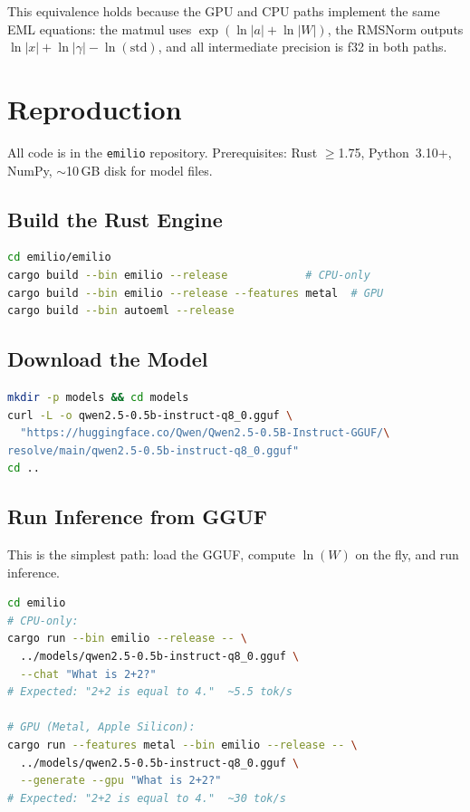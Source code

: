 \documentclass[acmsmall,nonacm]{acmart}
\begin{document}
This equivalence holds because the GPU and CPU paths implement the
same EML equations: the matmul uses $\exp(\ln|a| + \ln|W|)$, the
RMSNorm outputs $\ln|x| + \ln|\gamma| - \ln(\mathrm{std})$, and
all intermediate precision is f32 in both paths.


\section{Reproduction}
\label{sec:reproduce}

All code is in the \texttt{emilio} repository.  Prerequisites: Rust
$\geq$1.75, Python~3.10+, NumPy, $\sim$10\,GB disk for model files.

\subsection{Build the Rust Engine}

\begin{lstlisting}[language=bash,caption={Building emilio.}]
cd emilio/emilio
cargo build --bin emilio --release            # CPU-only
cargo build --bin emilio --release --features metal  # GPU
cargo build --bin autoeml --release
\end{lstlisting}

\subsection{Download the Model}

\begin{lstlisting}[language=bash,caption={Downloading Qwen2.5-0.5B-Instruct Q8.}]
mkdir -p models && cd models
curl -L -o qwen2.5-0.5b-instruct-q8_0.gguf \
  "https://huggingface.co/Qwen/Qwen2.5-0.5B-Instruct-GGUF/\
resolve/main/qwen2.5-0.5b-instruct-q8_0.gguf"
cd ..
\end{lstlisting}

\subsection{Run Inference from GGUF}

This is the simplest path: load the GGUF, compute $\ln(W)$ on the fly,
and run inference.

\begin{lstlisting}[language=bash,caption={GGUF inference (computes ln(W) at load time).}]
cd emilio
# CPU-only:
cargo run --bin emilio --release -- \
  ../models/qwen2.5-0.5b-instruct-q8_0.gguf \
  --chat "What is 2+2?"
# Expected: "2+2 is equal to 4."  ~5.5 tok/s

# GPU (Metal, Apple Silicon):
cargo run --features metal --bin emilio --release -- \
  ../models/qwen2.5-0.5b-instruct-q8_0.gguf \
  --generate --gpu "What is 2+2?"
# Expected: "2+2 is equal to 4."  ~30 tok/s
\end{lstlisting}
\end{document}
